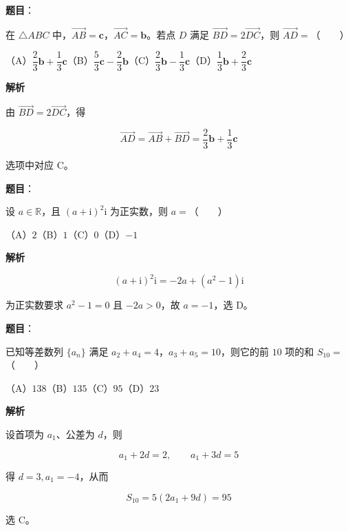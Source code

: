\begin{answer}

\textbf{题目}：

在 $\triangle ABC$ 中，$\overrightarrow{AB}=\boldsymbol c$，$\overrightarrow{AC}=\boldsymbol b$。若点 $D$ 满足 $\overrightarrow{BD}=2\overrightarrow{DC}$，则 $\overrightarrow{AD}=$\mbox{（　　）}

（A）$\dfrac23\boldsymbol b+\dfrac13\boldsymbol c$\quad（B）$\dfrac53\boldsymbol c-\dfrac23\boldsymbol b$\quad（C）$\dfrac23\boldsymbol b-\dfrac13\boldsymbol c$\quad（D）$\dfrac13\boldsymbol b+\dfrac23\boldsymbol c$

\textbf{解析}

由 $\overrightarrow{BD}=2\overrightarrow{DC}$，得

\nopagebreak[4]
\[
\overrightarrow{AD}
=\overrightarrow{AB}+\overrightarrow{BD}
=\frac23\boldsymbol b+\frac13\boldsymbol c
\]

选项中对应 C。


\end{answer}
\begin{answer}

\textbf{题目}：

设 $a\in\mathbb R$，且 $(a+\mathrm i)^2\mathrm i$ 为正实数，则 $a=$\mbox{（　　）}

（A）$2$\quad（B）$1$\quad（C）$0$\quad（D）$-1$

\textbf{解析}

\nopagebreak[4]
\[
(a+\mathrm i)^2\mathrm i=-2a+(a^2-1)\mathrm i
\]

为正实数要求 $a^2-1=0$ 且 $-2a>0$，故 $a=-1$，选 D。


\end{answer}
\begin{answer}

\textbf{题目}：

已知等差数列 $\{a_n\}$ 满足 $a_2+a_4=4$，$a_3+a_5=10$，则它的前 $10$ 项的和 $S_{10}=$\mbox{（　　）}

（A）$138$\quad（B）$135$\quad（C）$95$\quad（D）$23$

\textbf{解析}

设首项为 $a_1$、公差为 $d$，则

\nopagebreak[4]
\[
a_1+2d=2,\qquad a_1+3d=5
\]

得 $d=3,a_1=-4$，从而

\nopagebreak[4]
\[
S_{10}=5(2a_1+9d)=95
\]

选 C。


\end{answer}
